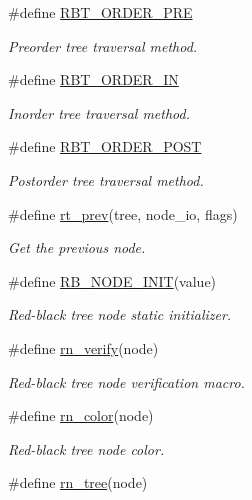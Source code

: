 \begin{CompactItemize}
\#define \hyperlink{group__dbprim__rbtree_a21}{RBT\_\-ORDER\_\-PRE}
\begin{CompactList}\small\item\em Preorder tree traversal method.\item\end{CompactList}\item 
\#define \hyperlink{group__dbprim__rbtree_a22}{RBT\_\-ORDER\_\-IN}
\begin{CompactList}\small\item\em Inorder tree traversal method.\item\end{CompactList}\item 
\#define \hyperlink{group__dbprim__rbtree_a23}{RBT\_\-ORDER\_\-POST}
\begin{CompactList}\small\item\em Postorder tree traversal method.\item\end{CompactList}\item 
\#define \hyperlink{group__dbprim__rbtree_a24}{rt\_\-prev}(tree, node\_\-io, flags)
\begin{CompactList}\small\item\em Get the previous node.\item\end{CompactList}\item 
\#define \hyperlink{group__dbprim__rbtree_a25}{RB\_\-NODE\_\-INIT}(value)
\begin{CompactList}\small\item\em Red-black tree node static initializer.\item\end{CompactList}\item 
\#define \hyperlink{group__dbprim__rbtree_a26}{rn\_\-verify}(node)
\begin{CompactList}\small\item\em Red-black tree node verification macro.\item\end{CompactList}\item 
\#define \hyperlink{group__dbprim__rbtree_a27}{rn\_\-color}(node)
\begin{CompactList}\small\item\em Red-black tree node color.\item\end{CompactList}\item 
\#define \hyperlink{group__dbprim__rbtree_a28}{rn\_\-tree}(node)

\end{CompactItemize}
